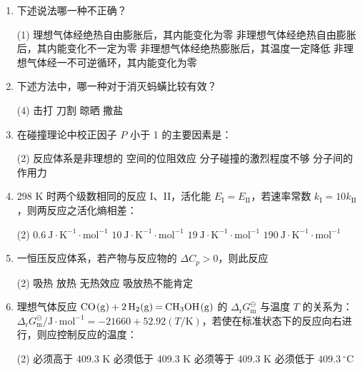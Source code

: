 \begin{enumerate}[label=\arabic*., start=1, itemsep=1.5ex]
    \item 下述说法哪一种不正确？
    \begin{tasks}(1) 
        \task 理想气体经绝热自由膨胀后，其内能变化为零
        \task 非理想气体经绝热自由膨胀后，其内能变化不一定为零
        \task 非理想气体经绝热膨胀后，其温度一定降低
        \task 非理想气体经一不可逆循环，其内能变化为零
    \end{tasks}

    \item 下述方法中，哪一种对于消灭蚂蟥比较有效？
    \begin{tasks}(4)
        \task 击打
        \task 刀割
        \task 晾晒
        \task 撒盐
    \end{tasks}

    \item 在碰撞理论中校正因子 $P$ 小于 1 的主要因素是：
    \begin{tasks}(2)
        \task 反应体系是非理想的
        \task 空间的位阻效应
        \task 分子碰撞的激烈程度不够
        \task 分子间的作用力
    \end{tasks}

    \item 298 K 时两个级数相同的反应 I、II，活化能 $E_\text{I} = E_\text{II}$，若速率常数 $k_\text{I} = 10 k_\text{II}$，则两反应之活化熵相差：
    \begin{tasks}(2)
        \task $0.6\ \text{J}\cdot\text{K}^{-1}\cdot\text{mol}^{-1}$
        \task $10\ \text{J}\cdot\text{K}^{-1}\cdot\text{mol}^{-1}$
        \task $19\ \text{J}\cdot\text{K}^{-1}\cdot\text{mol}^{-1}$
        \task $190\ \text{J}\cdot\text{K}^{-1}\cdot\text{mol}^{-1}$
    \end{tasks}

    \item 一恒压反应体系，若产物与反应物的 $\Delta C_p > 0$，则此反应
    \begin{tasks}(2)
        \task 吸热
        \task 放热
        \task 无热效应
        \task 吸放热不能肯定
    \end{tasks}

    \item 理想气体反应 $\ce{CO(g) + 2H2(g) = CH3OH(g)}$ 的 $\Delta_\text{r} G_\text{m}^\ominus$ 与温度 $T$ 的关系为：\\
    $\Delta_\text{r} G_\text{m}^\ominus / \text{J}\cdot\text{mol}^{-1} = -21660 + 52.92(T/\text{K})$，若使在标准状态下的反应向右进行，则应控制反应的温度：
    \begin{tasks}(2)
        \task 必须高于 409.3 K
        \task 必须低于 409.3 K
        \task 必须等于 409.3 K
        \task 必须低于 $409.3\ ^\circ\text{C}$
    \end{tasks}


\end{enumerate}
